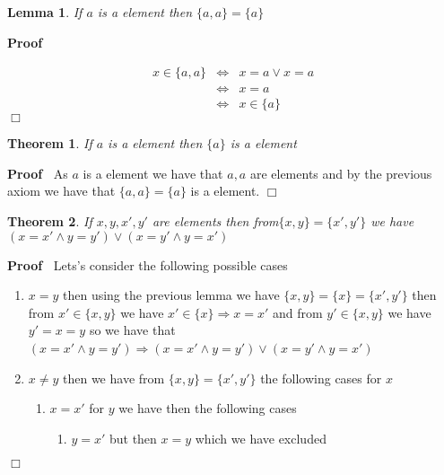 \documentclass{book}
\newenvironment{proof}{\noindent\textbf{Proof\ }}{\hspace*{\fill}$\Box$\medskip}
\newtheorem{lemma}{Lemma}
\newtheorem{theorem}{Theorem}
\begin{document}
{{\begin{lemma}
  If $a$ is a element then $\{ a, a \} = \{ a \}$ 
\end{lemma}

\begin{proof}
  
  \begin{eqnarray*}
    x \in \{ a, a \} & \Leftrightarrow & x = a \vee x = a\\
    & \Leftrightarrow & x = a\\
    & \Leftrightarrow & x \in \{ a \}
  \end{eqnarray*}
\end{proof}

\begin{theorem}
  If $a$ is a element then $\{ a \}$ is a element
\end{theorem}

\begin{proof}
  As $a$ is a element we have that $a, a$ are elements and by the previous
  axiom we have that $\{ a, a \} = \{ a \}$ is a element.
\end{proof}

\begin{theorem}
  \label{equality of unordered pairs}If $x, y, x', y'$ are elements then
  from$\{ x, y \} = \{ x', y' \}$ we have $(x = x' \wedge y = y') \vee (x = y'
  \wedge y = x')$
\end{theorem}

\begin{proof}
  Lets's consider the following possible cases
  \begin{enumerate}
    \item $x = y$ then using the previous lemma we have $\{ x, y \} = \{ x \}
    = \{ x', y' \}$ then from $x' \in \{ x, y \}$ we have $x' \in \{ x \}
    \Rightarrow x = x'$ and from $y' \in \{ x, y \}$ we have $y' = x = y$ so
    we have that $(x = x' \wedge y = y') \Rightarrow (x = x' \wedge y = y')
    \vee (x = y' \wedge y = x')$ \
    
    \item $x \neq y$ then we have from $\{ x, y \} = \{ x', y' \}$ the
    following cases for $x$
    \begin{enumerate}
      \item $x = x'$ for $y$ we have then the following cases
      \begin{enumerate}
        \item $y = x'$ but then $x = y$ which we have excluded
        

\end{enumerate}
\end{enumerate}
\end{enumerate}
\end{proof}}}
\end{document}
